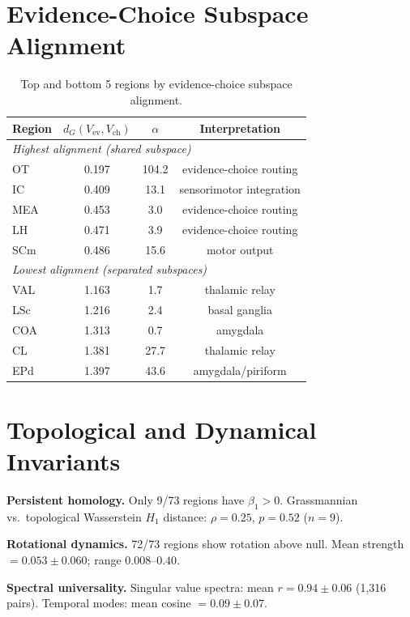 \documentclass{article}
\begin{document}
\section{Evidence-Choice Subspace Alignment}
\label{app:alignment}

\begin{table}[h]
\centering
\small
\caption{Top and bottom 5 regions by evidence-choice subspace alignment.}
\label{tab:routing}
\begin{tabular}{@{}lccc@{}}
\toprule
\textbf{Region} & \textbf{$d_G(V_{\text{ev}}, V_{\text{ch}})$} & \textbf{$\alpha$} & \textbf{Interpretation} \\
\midrule
\multicolumn{4}{l}{\emph{Highest alignment (shared subspace)}} \\
OT & 0.197 & 104.2 & evidence-choice routing \\
IC & 0.409 & 13.1 & sensorimotor integration \\
MEA & 0.453 & 3.0 & evidence-choice routing \\
LH & 0.471 & 3.9 & evidence-choice routing \\
SCm & 0.486 & 15.6 & motor output \\
\midrule
\multicolumn{4}{l}{\emph{Lowest alignment (separated subspaces)}} \\
VAL & 1.163 & 1.7 & thalamic relay \\
LSc & 1.216 & 2.4 & basal ganglia \\
COA & 1.313 & 0.7 & amygdala \\
CL & 1.381 & 27.7 & thalamic relay \\
EPd & 1.397 & 43.6 & amygdala/piriform \\
\bottomrule
\end{tabular}
\end{table}

\section{Topological and Dynamical Invariants}
\label{app:topo_dyn}

\textbf{Persistent homology.} Only 9/73 regions have $\beta_1 > 0$. Grassmannian vs.\ topological Wasserstein $H_1$ distance: $\rho = 0.25$, $p = 0.52$ ($n = 9$).

\textbf{Rotational dynamics.} 72/73 regions show rotation above null. Mean strength $= 0.053 \pm 0.060$; range $0.008$--$0.40$.

\textbf{Spectral universality.} Singular value spectra: mean $r = 0.94 \pm 0.06$ (1,316 pairs). Temporal modes: mean cosine $= 0.09 \pm 0.07$.
\end{document}
